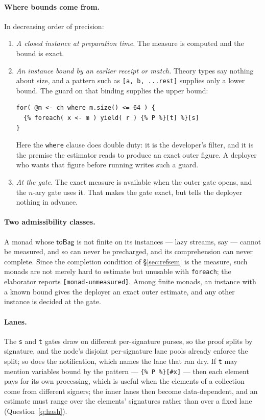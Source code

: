 \documentclass[11pt]{article}
\theoremstyle{definition}
\theoremstyle{plain}
\theoremstyle{remark}
\newcommand{\fe}{\texttt{foreach}}
\begin{document}
\paragraph{Where bounds come from.} In decreasing order of precision:
\begin{enumerate}[nosep]
\item \emph{A closed instance at preparation time.} The measure is computed and
the bound is exact.
\item \emph{An instance bound by an earlier receipt or match.} Theory types say
nothing about size, and a pattern such as \verb|[a, b, ...rest]| supplies only
a lower bound. The guard on that binding supplies the upper bound:
\begin{lstlisting}
for( @m <- ch where m.size() <= 64 ) {
  {% foreach( x <- m ) yield( r ) {% P %}[t] %}[s]
}
\end{lstlisting}
Here the \texttt{where} clause does double duty: it is the developer's filter,
and it is the premise the estimator reads to produce an exact outer figure. A
deployer who wants that figure before running writes such a guard.
\item \emph{At the gate.} The exact measure is available when the outer gate
opens, and the \(n\)-ary gate uses it. That makes the gate exact, but tells the
deployer nothing in advance.
\end{enumerate}

\paragraph{Two admissibility classes.} A monad whose \(\mathsf{toBag}\) is not
finite on its instances --- lazy streams, say --- cannot be measured, and so can
never be precharged, and its comprehension can never complete. Since the
completion condition of \S\ref{sec:refsem} is the measure, such monads are not
merely hard to estimate but unusable with \fe{}; the elaborator reports
\texttt{[monad-unmeasured]}. Among finite monads, an instance with a known bound
gives the deployer an exact outer estimate, and any other instance is decided at
the gate.

\paragraph{Lanes.} The \texttt{s} and \texttt{t} gates draw on different
per-signature purses, so the proof splits by signature, and the node's disjoint
per-signature lane pools already enforce the split; so does the
notification, which names the lane that ran dry. If \texttt{t} may mention
variables bound by the pattern --- \verb|{% P %}[#x]| --- then each element pays
for its own processing, which is useful when the elements of a collection come
from different signers; the inner lanes then become data-dependent, and an
estimate must range over the elements' signatures rather than over a fixed lane
(Question~\ref{q:hash}).
\end{document}
